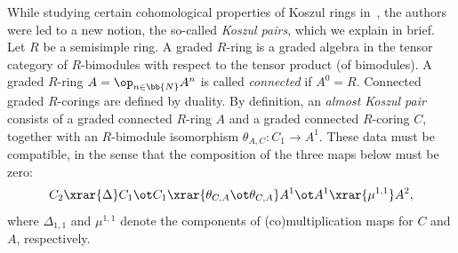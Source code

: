 While studying certain cohomological properties of Koszul rings in~\cite{jps}, the authors were led to a new notion, the so-called \emph{Koszul pairs}, which we explain in brief. Let $R$ be a semisimple ring. A graded $R$-ring is a graded algebra in the tensor category of $R$-bimodules with respect to the tensor product (of bimodules). A graded $R$-ring $A = \op_{n \in \bb{N}} A^n$ is called \emph{connected} if $A^0 = R$. Connected graded $R$-corings are def\/ined by duality. By def\/inition, an \emph{almost Koszul pair} consists of a graded connected $R$-ring $A$ and a graded connected $R$-coring $C$, together with an $R$-bimodule isomorphism $\theta_{A,C}\colon C_1 \to A^1$. These data must be compatible, in the sense that the composition of the three maps below must be zero:
\begin{gather}\label{ec:theta}
C_2 \xrar{\Delta} C_1 \ot C_1 \xrar{\theta_{C,A} \ot \theta_{C,A}} A^1 \ot A^1 \xrar{\mu^{1,1}} A^2,	
\end{gather}
where $\Delta_{1,1}$ and $\mu^{1,1}$ denote the components of (co)multiplication maps for $C$ and $A$, respectively.
